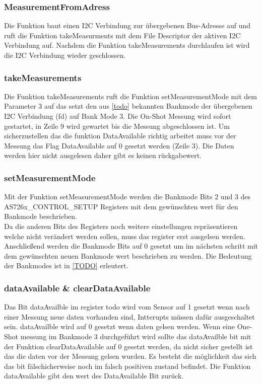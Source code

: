 \subsubsection{MeasurementFromAdress}
Die Funktion baut einen I2C Verbindung zur übergebenen Bus-Adresse auf und  ruft die Funktion takeMeasurments mit dem File Descriptor der aktiven I2C Verbindung auf.
Nachdem die Funktion takeMeasurements durchlaufen ist wird die I2C Verbindung wieder geschlossen.


\subsubsection{takeMeasurements}

Die Funktion takeMeasurements ruft die Funktion setMeasurementMode mit dem Parameter 3 auf das setzt den aus \ref{todo} bekannten Bankmode der übergebenen I2C Verbindung (fd) auf Bank Mode 3.
	Die On-Shot Messung wird sofort gestartet, in Zeile 9 wird gewartet bis die Messung abgeschlossen ist. 
		Um sicherzustellen das die funktion DataAvailable richtig arbeitet muss vor der Messung das Flag DataAvailable auf 0 gesetzt werden (Zeile 3).
Die Daten werden hier nicht ausgelesen daher gibt es keinen rückgabewert.\\


\subsubsection{setMeasurementMode}
Mit der Funktion setMeasurementMode werden die Bankmode Bits 2 und 3 des AS726x\_CONTROL\_SETUP Registers mit dem gewünschten wert für den Bankmode beschrieben.\\
Da die anderen Bits des Registers noch weitere einstellungen repräsentieren welche nicht verändert werden sollen, muss das register erst ausgelsen werden.
Anschließend werden die Bankmode Bits auf 0 gesetzt um im nächsten schritt mit dem gewünschten neuen Bankmode wert beschrieben zu werden. 
Die Bedeutung der Bankmodes ist in \ref{TODO} erleutert.

\subsubsection{dataAvailable \& clearDataAvailable}
Das Bit dataAvailble im register todo wird vom Sensor auf 1 gesetzt wenn nach einer Messung neue daten vorhanden sind, Intterupts müssen dafür ausgeschaltet sein.
dataAvailble wird auf 0 gesetzt wenn daten gelsen werden.
Wenn eine One-Shot messung im Bankmode 3 durchgeführt wird sollte das dataAvailble bit mit der Funktion clearDataAvailable auf 0 gesetzt werden, da nicht sicher gestellt ist das die daten vor der Messung gelsen wurden. Es besteht die möglichkeit das sich das bit fälschicherweise noch im falsch positiven zustand befindet.
Die Funktion dataAvailable gibt den wert des DataAvailable Bit zurück.

